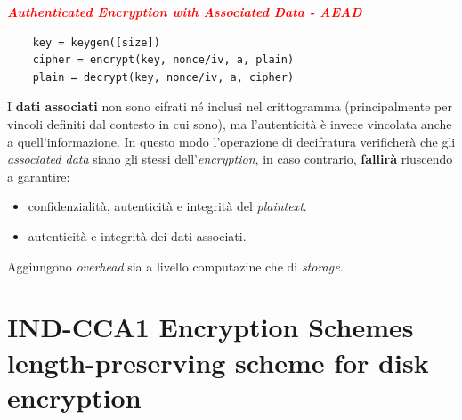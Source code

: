 \newpage

\begin{flushleft}
    \textcolor{red}{\textbf{\textit{Authenticated Encryption with Associated Data - AEAD}}}
    \begin{lstlisting}
    key = keygen([size])
    cipher = encrypt(key, nonce/iv, a, plain)
    plain = decrypt(key, nonce/iv, a, cipher)
    \end{lstlisting}
    \vspace*{-\baselineskip}
    I \textbf{dati associati} non sono cifrati né inclusi nel crittogramma (principalmente per vincoli definiti dal contesto in cui sono), ma l'autenticità è invece vincolata anche a quell'informazione. In questo modo l'operazione di decifratura verificherà che gli \textit{associated data} siano gli stessi dell'\textit{encryption}, in caso contrario, \textbf{fallirà} riuscendo a garantire:
    \begin{itemize}[nosep]
        \item confidenzialità, autenticità e integrità del \textit{plaintext}.
        \item autenticità e integrità dei dati associati.
    \end{itemize}
    Aggiungono \textit{overhead} sia a livello computazine che di \textit{storage}.
\end{flushleft}

\section{IND-CCA1 Encryption Schemes \\ \small{length-preserving scheme for disk encryption}}

